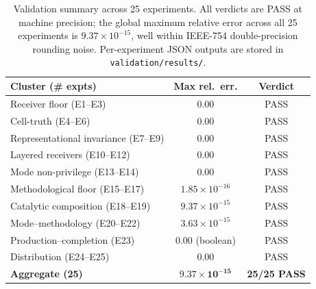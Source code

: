 \documentclass[twocolumn,11pt,a4paper]{article}
\begin{document}
\begin{table}[h!]\centering
\begin{tabular}{lcc}
\toprule
\textbf{Cluster (\# expts)} & \textbf{Max rel.\ err.} & \textbf{Verdict}\\\midrule
Receiver floor (E1--E3)              & $0.00$                       & PASS\\
Cell-truth (E4--E6)                  & $0.00$                       & PASS\\
Representational invariance (E7--E9) & $0.00$                       & PASS\\
Layered receivers (E10--E12)         & $0.00$                       & PASS\\
Mode non-privilege (E13--E14)        & $0.00$                       & PASS\\
Methodological floor (E15--E17)      & $1.85\times 10^{-16}$        & PASS\\
Catalytic composition (E18--E19)     & $9.37\times 10^{-15}$        & PASS\\
Mode--methodology (E20--E22)         & $3.63\times 10^{-15}$        & PASS\\
Production--completion (E23)         & $0.00$ (boolean)             & PASS\\
Distribution (E24--E25)              & $0.00$                       & PASS\\\midrule
\textbf{Aggregate (25)}              & $\mathbf{9.37\times 10^{-15}}$ & \textbf{25/25 PASS}\\\bottomrule
\end{tabular}
\caption{Validation summary across 25 experiments. All verdicts are PASS at
machine precision; the global maximum relative error across all 25
experiments is $9.37\times 10^{-15}$, well within IEEE-754
double-precision rounding noise. Per-experiment JSON outputs are stored in
\texttt{validation/results/}.}
\label{tab:validation}
\end{table}
\end{document}
